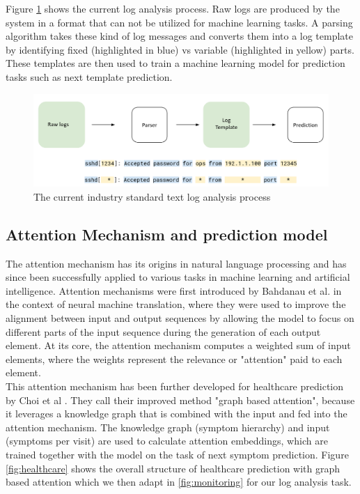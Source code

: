 Figure \ref{fig:process} shows the current log analysis process. Raw logs are produced by the system in a format that can not be utilized for machine learning tasks. A parsing algorithm takes these kind of log messages and converts them into a log template by identifying fixed (highlighted in blue) vs variable (highlighted in yellow) parts. These templates are then used to train a machine learning model for prediction tasks such as next template prediction. 
\begin{figure}[H]
    \centering
    \includegraphics[keepaspectratio=true,scale=0.3]{figures/4_methods/3_text_log_analysis_process.png}
    \caption{The current industry standard text log analysis process}
    \label{fig:process}
\end{figure}

\subsection{Attention Mechanism and prediction model}
\label{sec:Methods:Fundamentals:Attention}
The attention mechanism has its origins in natural  language processing \cite{bahdanau2016neural} and has since been successfully applied to various tasks in machine learning and artificial intelligence. Attention mechanisms were first introduced by Bahdanau et al. in the context of neural machine translation, where they were used to improve the alignment between input and output sequences by allowing the model to focus on different parts of the input sequence during the generation of each output element. At its core, the attention mechanism computes a weighted sum of input elements, where the weights represent the relevance or "attention" paid to each element.\\

This attention mechanism has been further developed for healthcare prediction by Choi et al \cite{choi2017gram}. They call their improved method "graph based attention", because it leverages a knowledge graph that is combined with the input and fed into the attention mechanism. The knowledge graph (symptom hierarchy) and input (symptoms per visit) are used to calculate attention embeddings, which are trained together with the model on the task of next symptom prediction. 
Figure \ref{fig:healthcare} shows the overall structure of healthcare prediction with graph based attention which we then adapt in \ref{fig:monitoring} for our log analysis task. \\

